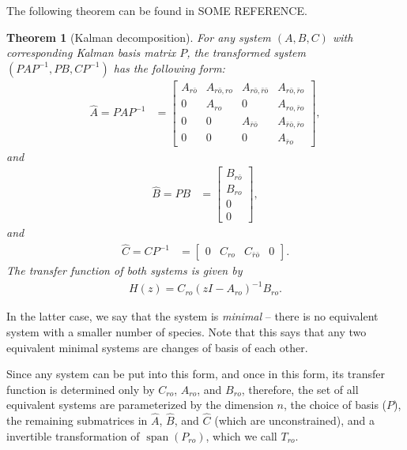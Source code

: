 \documentclass[11 pt]{article}
\newcommand{\ro}{{ro}}
\newcommand{\nro}{{\bar{r}o}}
\newcommand{\rno}{{r\bar{o}}}
\newcommand{\nrno}{{\bar{r}\bar{o}}}
\DeclareMathOperator{\spn}{span}
\newtheorem{theorem}{Theorem}
\begin{document}
The following theorem can be found in SOME REFERENCE.

\begin{theorem}[Kalman decomposition] \label{thm:kalman}
        For any system $(A,B,C)$ with corresponding Kalman basis matrix $P$,
        the transformed system $(PAP^{-1},PB,CP^{-1})$  has the following form:
        \begin{align*}
            \widehat A = PAP^{-1}
            &=
            \left[ \begin{array}{cccc}
                A_{\rno} & A_{\rno,\ro} & A_{\rno,\nrno} & A_{\rno,\nro} \\
                0 & A_{\ro} & 0 & A_{\ro,\nro} \\
                0 & 0 & A_{\nrno} & A_{\nrno,\nro} \\
                0 & 0 & 0 & A_{\nro}
            \end{array} \right] ,
        \end{align*}
        and
        \begin{align*}
            \widehat B = PB
            &=
            \left[ \begin{array}{cccc}
                B_{\rno} \\
                B_{\ro} \\
                0 \\
                0 
            \end{array} \right] ,
        \end{align*}
        and
        \begin{align*}
            \widehat C = CP^{-1}
            &=
            \left[ \begin{array}{cccc}
                0 & C_{\ro} & C_{\nrno} & 0 
            \end{array} \right] .
        \end{align*}
        The transfer function of both systems is given by
        \begin{align*}
            H(z) = C_{\ro} ( zI - A_{\ro} )^{-1} B_{\ro} .
        \end{align*}
\end{theorem}

In the latter case, we say that the system is \emph{minimal} 
-- there is no equivalent system with a smaller number of species.
Note that this says that any two equivalent minimal systems
are changes of basis of each other.

Since any system can be put into this form,
and once in this form, its transfer function is determined only by 
$C_{\ro}$, $A_{\ro}$, and $B_\ro$,
therefore, the set of all equivalent systems are parameterized by
the dimension $n$,
the choice of basis ($P$),
the remaining submatrices in $\widehat A$, $\widehat B$, and $\widehat C$
(which are unconstrained),
and a invertible transformation of $\spn(P_{\ro})$, which we call $T_\ro$.
\end{document}
